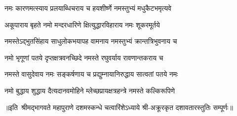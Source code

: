 

\twolineshloka
{नमः कारणमत्स्याय प्रलयाब्धिचराय च}
{हयशीर्ष्णे नमस्तुभ्यं मधुकैटभमृत्यवे}%

\twolineshloka
{अकूपाराय बृहते नमो मन्दरधारिणे}
{क्षित्युद्धारविहाराय नमः शूकरमूर्तये}%

\twolineshloka
{नमस्तेऽद्भुतसिंहाय साधुलोकभयापह}
{वामनाय नमस्तुभ्यं क्रान्तत्रिभुवनाय च}%

\twolineshloka
{नमो भृगूणां पतये दृप्तक्षत्रवनच्छिदे}
{नमस्ते रघुवर्याय रावणान्तकराय च}%

\twolineshloka
{नमस्ते वासुदेवाय नमः सङ्कर्षणाय च}
{प्रद्युम्नायानिरुद्धाय सात्वतां पतये नमः}%

\twolineshloka
{नमो बुद्धाय शुद्धाय दैत्यदानवमोहिने}
{म्लेच्छप्रायक्षत्रहन्त्रे नमस्ते कल्किरूपिणे}%

॥इति~श्रीमद्भागवते महापुराणे दशमस्कन्धे चत्वारिंशेऽध्याये श्री-अक्रूरकृत दशावतारस्तुतिः सम्पूर्णः॥ 
%

%

%
%

